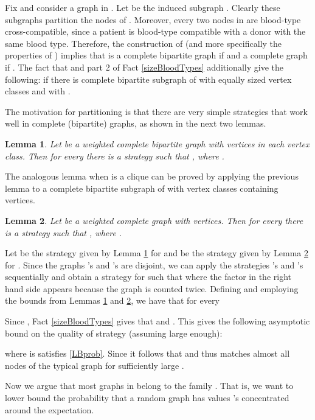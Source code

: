 \documentclass[12pt]{article}
\newtheorem{lemma}{Lemma}
\begin{document}
		Fix  and consider a graph  in . Let  be the induced subgraph . Clearly these subgraphs partition the nodes of . Moreover, every two nodes in  are blood-type cross-compatible, since a patient is blood-type compatible with a donor with the same blood type. Therefore, the construction of  (and more specifically the properties of ) implies that  is a complete bipartite graph if  and a complete graph if . The fact that  and part 2 of Fact \ref{sizeBloodTypes} additionally give the following: if  there is complete bipartite subgraph  of  with equally sized vertex classes and with . 
		
		The motivation for partitioning  is that there are very simple strategies that work well in complete (bipartite) graphs, as shown in the next two lemmas. 
		
		\begin{lemma} \label{Sbipartite}
			Let  be a weighted complete bipartite graph with  vertices in each vertex class. Then for every  there is a strategy  such that , where . 
		\end{lemma}		
	
	The analogous lemma when  is a clique can be proved by applying the previous lemma to a complete bipartite subgraph of  with vertex classes containing  vertices. 
	
		\begin{lemma} \label{Scomplete}
			Let  be a weighted complete graph with  vertices. Then for every  there is a strategy  such that , where .  
		\end{lemma}

		Let  be the strategy given by Lemma \ref{Sbipartite} for  and  be the strategy given by Lemma \ref{Scomplete} for . Since the graphs 's and 's are disjoint, we can apply the strategies 's and 's sequentially and obtain a strategy  for  such that  where the factor  in the right hand side appears because the graph  is counted twice. Defining  and employing the bounds from Lemmas \ref{Sbipartite} and \ref{Scomplete}, we have that for every 

	
		Since , Fact \ref{sizeBloodTypes} gives that  and . This gives the following asymptotic bound on the quality of strategy  (assuming  large enough):

		where  is satisfies \eqref{LBprob}. Since  it follows that  and thus  matches almost all nodes of the typical graph  for sufficiently large . 
		
		Now we argue that most graphs in  belong to the family . That is, we want to lower bound the probability that a random graph  has values 's concentrated around the expectation. 
		
\end{document}
